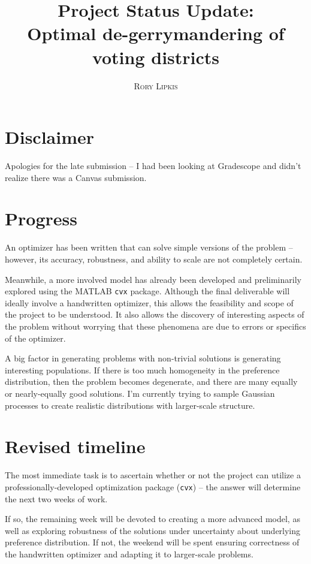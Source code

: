 \documentclass{article}
\title{\textbf{Project Status Update:\\Optimal de-gerrymandering of voting districts}}
\author{\textsc{Rory Lipkis}}
\date{}
\begin{document}
\maketitle

\section*{Disclaimer}

Apologies for the late submission -- I had been looking at Gradescope and didn't realize there was a Canvas submission.

\section*{Progress}

An optimizer has been written that can solve simple versions of the problem -- however, its accuracy, robustness, and ability to scale are not completely certain.

Meanwhile, a more involved model has already been developed and preliminarily explored using the MATLAB \texttt{cvx} package. Although the final deliverable will ideally involve a handwritten optimizer, this allows the feasibility and scope of the project to be understood. It also allows the discovery of interesting aspects of the problem without worrying that these phenomena are due to errors or specifics of the optimizer.

A big factor in generating problems with non-trivial solutions is generating interesting populations. If there is too much homogeneity in the preference distribution, then the problem becomes degenerate, and there are many equally or nearly-equally good solutions. I'm currently trying to sample Gaussian processes to create realistic distributions with larger-scale structure.

\section*{Revised timeline}

The most immediate task is to ascertain whether or not the project can utilize a professionally-developed optimization package (\texttt{cvx}) -- the answer will determine the next two weeks of work.

If so, the remaining week will be devoted to creating a more advanced model, as well as exploring robustness of the solutions under uncertainty about underlying preference distribution. If not, the weekend will be spent ensuring correctness of the handwritten optimizer and adapting it to larger-scale problems.
\end{document}
